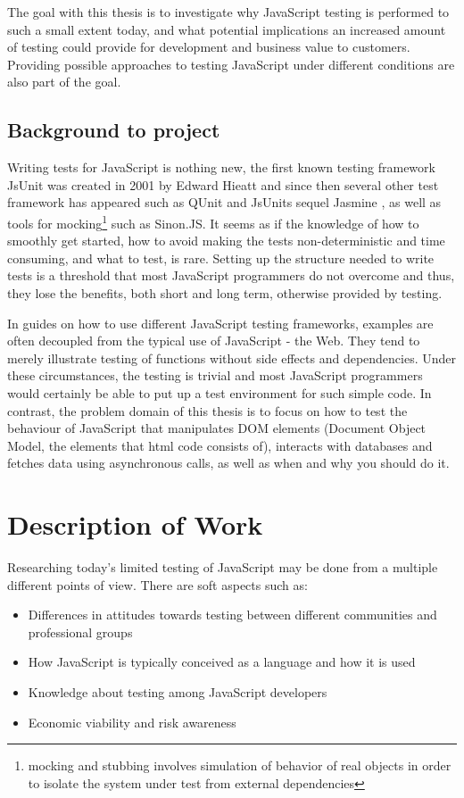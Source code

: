 \documentclass[11pt]{article}
\begin{document}
The goal with this thesis is to investigate why JavaScript testing is performed to such a small extent today, and what potential implications an increased amount of testing could provide for development and business value to customers. Providing possible approaches to testing JavaScript under different conditions are also part of the goal.

\subsection{Background to project}

Writing tests for JavaScript is nothing new, the first known testing framework JsUnit was created in 2001 by Edward Hieatt\cite{GoingFaster,JsUnitGithub} and since then several other test framework has appeared such as QUnit \cite{QUnitSite} and JsUnits sequel Jasmine \cite{JasmineSite}, as well as tools for mocking\footnote{mocking and stubbing involves simulation of behavior of real objects in order to isolate the system under test from external dependencies} such as Sinon.JS\cite{SinonJS}. It seems as if the knowledge of how to smoothly get started, how to avoid making the tests non-deterministic and time consuming, and what to test, is rare. Setting up the structure needed to write tests is a threshold that most JavaScript programmers do not overcome\cite{TestingStatistics} and thus, they lose the benefits, both short and long term, otherwise provided by testing.

In guides on how to use different JavaScript testing frameworks, examples are often decoupled from the typical use of JavaScript - the Web. They tend to merely illustrate testing of functions without side effects and dependencies. Under these circumstances, the testing is trivial and most JavaScript programmers would certainly be able to put up a test environment for such simple code. In contrast, the problem domain of this thesis is to focus on how to test the behaviour of JavaScript that manipulates DOM elements (Document Object Model, the elements that html code consists of), interacts with databases and fetches data using asynchronous calls, as well as when and why you should do it.

\section{Description of Work}

Researching today's limited testing of JavaScript may be done from a multiple different points of view. There are soft aspects such as:
\begin{itemize}
\item Differences in attitudes towards testing between different communities and professional groups
\item How JavaScript is typically conceived as a language and how it is used
\item Knowledge about testing among JavaScript developers
\item Economic viability and risk awareness
\end{itemize}
\end{document}
